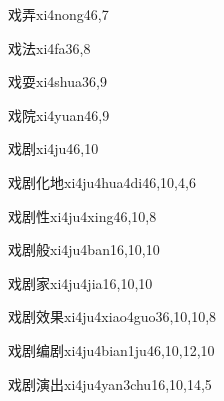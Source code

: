 \begin{verbete}{戏弄}{xi4nong4}{6,7}
\end{verbete}

\begin{verbete}{戏法}{xi4fa3}{6,8}
\end{verbete}

\begin{verbete}{戏耍}{xi4shua3}{6,9}
\end{verbete}

\begin{verbete}{戏院}{xi4yuan4}{6,9}
\end{verbete}

\begin{verbete}{戏剧}{xi4ju4}{6,10}
\end{verbete}

\begin{verbete}{戏剧化地}{xi4ju4hua4di4}{6,10,4,6}
\end{verbete}

\begin{verbete}{戏剧性}{xi4ju4xing4}{6,10,8}
\end{verbete}

\begin{verbete}{戏剧般}{xi4ju4ban1}{6,10,10}
\end{verbete}

\begin{verbete}{戏剧家}{xi4ju4jia1}{6,10,10}
\end{verbete}

\begin{verbete}{戏剧效果}{xi4ju4xiao4guo3}{6,10,10,8}
\end{verbete}

\begin{verbete}{戏剧编剧}{xi4ju4bian1ju4}{6,10,12,10}
\end{verbete}

\begin{verbete}{戏剧演出}{xi4ju4yan3chu1}{6,10,14,5}
\end{verbete}

